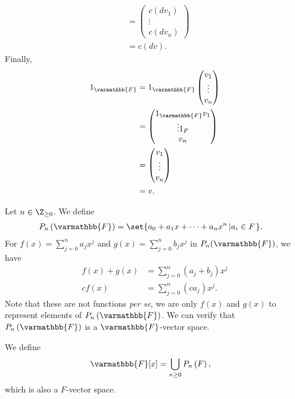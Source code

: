 \documentclass[10pt]{mypackage}
\renewcommand*{\mathbb}[1]{\varmathbb{#1}}
\begin{document}
\begin{example}[$F^{n}$]
\begin{align*}
          &= \begin{pmatrix}c\left(dv_1\right) \\\vdots\\c\left(dv_n\right)\end{pmatrix}\\
          &= c\left(dv\right).
  \end{align*}
  Finally,
  \begin{align*}
    1_{\mathbb{F}} &= 1_{\mathbb{F}} \begin{pmatrix}v_1\\\vdots\\v_n\end{pmatrix}\\
                   &= \begin{pmatrix}1_{\mathbb{F}}v_1\\\vdots 1_{F}\\v_n\end{pmatrix}\\
                   &= \begin{pmatrix}v_1\\\vdots\\v_n\end{pmatrix}\\
                   &= v.
  \end{align*}
\end{example}
\begin{example}[Polynomials]
  Let $n\in \Z_{\geq 0}$. We define
  \begin{align*}
    P_{n}\left(\mathbb{F}\right) &= \set{a_0 + a_1x + \cdots + a_nx^n\left|a_i\in F\right.}.
  \end{align*}
  For $f(x) = \sum_{j=0}^{n}a_jx^j$ and $g(x) = \sum_{j=0}^{n}b_jx^j$ in $P_n(\mathbb{F})$, we have
  \begin{align*}
    f(x) + g(x) &= \sum_{j=0}^{n}\left(a_j + b_j\right)x^j\\
    cf(x) &= \sum_{j=0}^{n}\left(ca_j\right)x^j.
  \end{align*}
  Note that these are not functions \textit{per se}, we are only $f(x)$ and $g(x)$ to represent elements of $P_n\left(\mathbb{F}\right)$. We can verify that $P_n\left(\mathbb{F}\right)$ is a $\mathbb{F}$-vector space.\newline

  We define
  \begin{align*}
    \mathbb{F}[x] &= \bigcup_{n\geq 0}P_n\left(F\right),
  \end{align*}
  which is also a $F$-vector space.
\end{example}
\end{document}
